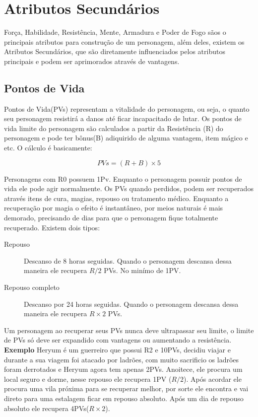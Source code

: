 \section{Atributos Secundários}

Força, Habilidade, Resistência, Mente, Armadura e Poder de Fogo sãos o principais atributos para construção de um personagem, além deles, existem os Atributos Secundários, que são diretamente influenciados pelos atributos principais e podem ser aprimorados através de vantagens.

\subsection{Pontos de Vida}

Pontos de Vida(PVs) representam a vitalidade do personagem, ou seja, o quanto seu personagem resistirá a danos até ficar incapacitado de lutar. Os pontos de vida limite do personagem são calculados a partir da Resistência (R) do personagem e pode ter bônus(B) adiquirido de alguma vantagem, item mágico e etc. O cálculo é basicamente:

\[ PVs = (R + B) \times 5 \]

Personagens com R0 possuem 1Pv. Enquanto o personagem possuir pontos de vida ele pode agir normalmente. Os PVs quando perdidos, podem ser recuperados através itens de cura, magias, repouso ou tratamento médico. Enquanto a recuperação por magia o efeito é instantâneo, por meios naturais é mais demorado, precisando de dias para que o personagem fique totalmente recuperado. Existem dois tipos:

\begin{description}
\item[Repouso] Descanso de 8 horas seguidas. Quando o personagem descansa dessa maneira ele recupera \( R/2 \) PVs. No minímo de 1PV.
\item[Repouso completo] Descanso por 24 horas seguidas. Quando o personagem descansa dessa maneira ele recupera \( R \times 2 \) PVs.
\end{description}

Um personagem ao recuperar seus PVs nunca deve ultrapassar seu limite, o limite de PVs só deve ser expandido com vantagens ou aumentando a resistência. {\bf Exemplo } Heryum é um guerreiro que possui R2 e 10PVs, decidiu viajar e durante a sua viagem foi atacado por ladrões, com muito sacrificio os ladrões foram derrotados e Heryum agora tem apenas 2PVs. Anoitece, ele procura um local seguro e dorme, nesse repouso ele recupera 1PV (\( R / 2 \)). Após acordar ele procura uma vila próxima para se recuperar melhor, por sorte ele encontra e vai direto para uma estalagem ficar em repouso absoluto. Após um dia de repouso absoluto ele recupera 4PVs(\( R \times 2 \)).


